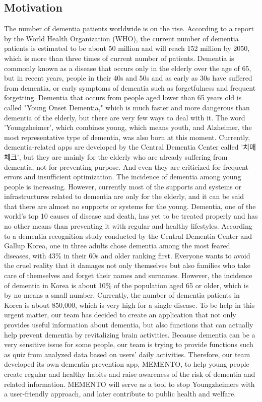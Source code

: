 \documentclass[conference]{IEEEtran}
\begin{document}
\subsection{Motivation}
The number of dementia patients worldwide is on the rise. According to a report by the World Health Organization (WHO), the current number of dementia patients is estimated to be about 50 million and will reach 152 million by 2050, which is more than three times of current number of patients. Dementia is commonly known as a disease that occurs only in the elderly over the age of 65, but in recent years, people in their 40s and 50s and as early as 30s have suffered from dementia, or early symptoms of dementia such as forgetfulness and frequent forgetting. Dementia that occurs from people aged lower than 65 years old is called "Young Onset Dementia," which is much faster and more dangerous than dementia of the elderly, but there are very few ways to deal with it. The word 'Youngzheimer', which combines young, which means youth, and Alzheimer, the most representative type of dementia, was also born at this moment. Currently, dementia-related apps are developed by the Central Dementia Center called '치매체크', but they are mainly for the elderly who are already suffering from dementia, not for preventing purpose. And even they are criticized for frequent errors and insufficient optimization. The incidence of dementia among young people is increasing. However, currently most of the supports and systems or infrastructures related to dementia are only for the elderly, and it can be said that there are almost no supports or systems for the young. Dementia, one of the world's top 10 causes of disease and death, has yet to be treated properly and has no other means than preventing it with regular and healthy lifestyles. According to a dementia recognition study conducted by the Central Dementia Center and Gallup Korea, one in three adults chose dementia among the most feared diseases, with 43\% in their 60s and older ranking first. Everyone wants to avoid the cruel reality that it damages not only themselves but also families who take care of themselves and forget their names and surnames. However, the incidence of dementia in Korea is about 10\% of the population aged 65 or older, which is by no means a small number. Currently, the number of dementia patients in Korea is about 850,000, which is very high for a single disease. To be help in this urgent matter, our team has decided to create an application that not only provides useful information about dementia, but also functions that can actually help prevent dementia by revitalizing brain activities. Because dementia can be a very sensitive issue for some people, our team is trying to provide functions such as quiz from analyzed data based on users' daily activities. Therefore, our team developed its own dementia prevention app, MEMENTO, to help young people create regular and healthy habits and raise awareness of the risk of dementia and related information. MEMENTO will serve as a tool to stop Youngzheimers with a user-friendly approach, and later contribute to public health and welfare.
\end{document}

